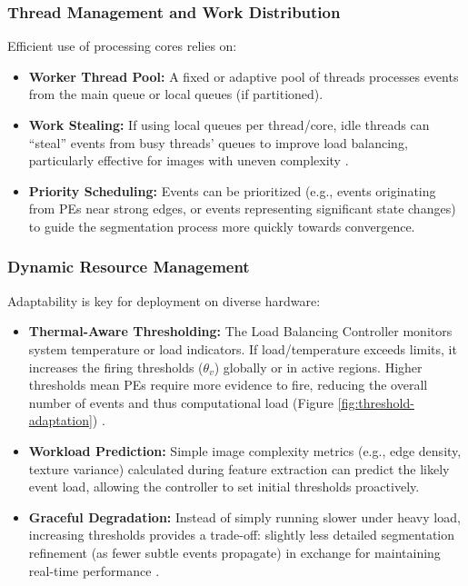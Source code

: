 \documentclass[conference]{IEEEtran}
\begin{document}
\subsubsection{Thread Management and Work Distribution} \label{subsubsec:thread_management}
Efficient use of processing cores relies on:
\begin{itemize}
    \item \textbf{Worker Thread Pool:} A fixed or adaptive pool of threads processes events from the main queue or local queues (if partitioned).
    \item \textbf{Work Stealing:} If using local queues per thread/core, idle threads can ``steal'' events from busy threads' queues to improve load balancing, particularly effective for images with uneven complexity \cite{Chase2005}.
    \item \textbf{Priority Scheduling:} Events can be prioritized (e.g., events originating from PEs near strong edges, or events representing significant state changes) to guide the segmentation process more quickly towards convergence.
\end{itemize}

\subsubsection{Dynamic Resource Management} \label{subsubsec:dynamic_resource}
Adaptability is key for deployment on diverse hardware:
\begin{itemize}
    \item \textbf{Thermal-Aware Thresholding:} The Load Balancing Controller monitors system temperature or load indicators. If load/temperature exceeds limits, it increases the firing thresholds (\(\theta_v\)) globally or in active regions. Higher thresholds mean PEs require more evidence to fire, reducing the overall number of events and thus computational load (Figure \ref{fig:threshold-adaptation}) \cite{Muir2025}.
    \item \textbf{Workload Prediction:} Simple image complexity metrics (e.g., edge density, texture variance) calculated during feature extraction can predict the likely event load, allowing the controller to set initial thresholds proactively.
    \item \textbf{Graceful Degradation:} Instead of simply running slower under heavy load, increasing thresholds provides a trade-off: slightly less detailed segmentation refinement (as fewer subtle events propagate) in exchange for maintaining real-time performance \cite{Christensen2022}.
\end{itemize}
\end{document}
